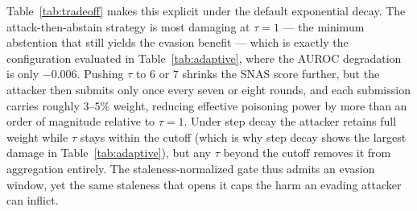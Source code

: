 Table~\ref{tab:tradeoff} makes this explicit under the default exponential decay. The attack-then-abstain strategy is most damaging at $\tau=1$ --- the minimum abstention that still yields the evasion benefit --- which is exactly the configuration evaluated in Table~\ref{tab:adaptive}, where the AUROC degradation is only $-0.006$. Pushing $\tau$ to $6$ or $7$ shrinks the SNAS score further, but the attacker then submits only once every seven or eight rounds, and each submission carries roughly $3$--$5\%$ weight, reducing effective poisoning power by more than an order of magnitude relative to $\tau=1$. Under step decay the attacker retains full weight while $\tau$ stays within the cutoff (which is why step decay shows the largest damage in Table~\ref{tab:adaptive}), but any $\tau$ beyond the cutoff removes it from aggregation entirely. The staleness-normalized gate thus admits an evasion window, yet the same staleness that opens it caps the harm an evading attacker can inflict.
